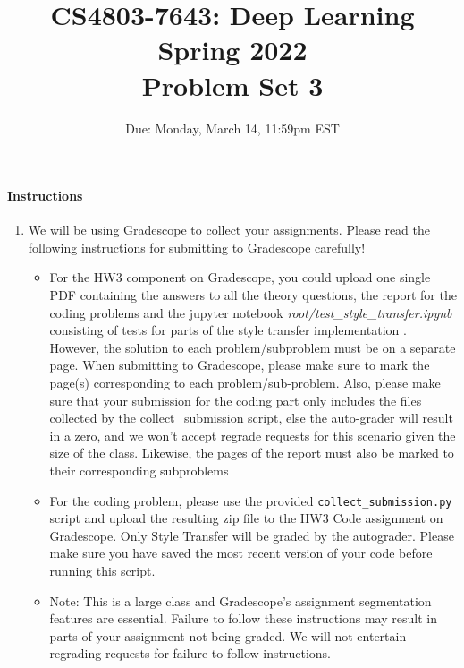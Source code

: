 \documentclass[11pt,english]{article}
\begin{document}
\title{CS4803-7643: Deep Learning\\
Spring 2022 \\
Problem Set 3}


\date{Due: Monday, March 14, 11:59pm EST}
\maketitle


\paragraph*{Instructions}
\begin{enumerate}
\item We will be using Gradescope to collect your assignments.  Please read the following instructions for submitting to Gradescope carefully!
     \begin{itemize}
          \item
                For the HW3 component on Gradescope, you could upload one single PDF containing the answers to all the theory questions, the report for the coding problems and the jupyter notebook \textit{root/test\_style\_transfer.ipynb} consisting of tests for parts of the style transfer implementation . However, the solution to each problem/subproblem must be on a separate page. When submitting to Gradescope, please make sure to mark the page(s) corresponding to each problem/sub-problem. Also, please make sure that your submission for the coding part only includes the files collected by the collect\_submission script, else the auto-grader will result in a zero, and we won't accept regrade requests for this scenario given the size of the class. Likewise, the pages of the report must also be marked to their corresponding subproblems

          \item
               For the coding problem,
               please use the provided \texttt{collect\_submission.py} script and upload the resulting zip file to the HW3 Code assignment on Gradescope. Only Style Transfer will be graded by the autograder.
               Please make sure you have saved the most recent version of your code before running this script.

          \item
               Note: This is a large class and Gradescope's assignment segmentation features are essential.
               Failure to follow these instructions may result in parts of your assignment not being graded.
               We will not entertain regrading requests for failure to follow instructions.



\end{itemize}
\end{enumerate}
\end{document}
